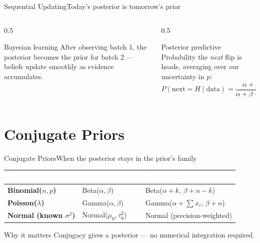 \documentclass[aspectratio=169,11pt]{beamer}
\begin{document}
\begin{frame}{Sequential Updating}{Today's posterior is tomorrow's prior}
  \begin{columns}[T]
    \begin{column}{0.5\textwidth}
      \begin{block}{Bayesian learning}
        \small After observing batch 1, the posterior becomes the prior
        for batch 2 — beliefs update smoothly as evidence accumulates.
      \end{block}
    \end{column}
    \begin{column}{0.5\textwidth}
      \begin{exampleblock}{Posterior predictive}
        \small Probability the \emph{next} flip is heads, averaging over
        our uncertainty in $p$:
        \[ P(\text{next}=H\mid\text{data}) = \frac{\alpha+k}{\alpha+\beta+n} \]
      \end{exampleblock}
    \end{column}
  \end{columns}
\end{frame}

\section{Conjugate Priors}

\begin{frame}{Conjugate Priors}{When the posterior stays in the prior's family}
  \small
  \renewcommand{\arraystretch}{1.35}
  \begin{center}
  \begin{tabularx}{\textwidth}{@{}>{\bfseries}l l >{\raggedright\arraybackslash}X@{}}
    \toprule
    \rowcolor{PrimaryDark}
    \textcolor{white}{Likelihood} & \textcolor{white}{Conjugate prior} & \textcolor{white}{Posterior} \\
    \midrule
    Binomial($n,p$) & Beta($\alpha,\beta$) & Beta($\alpha+k,\,\beta+n-k$) \\
    \rowcolor{PrimaryLight!25}
    Poisson($\lambda$) & Gamma($\alpha,\beta$) & Gamma($\alpha+\sum x_i,\,\beta+n$) \\
    Normal (known $\sigma^2$) & Normal($\mu_0,\tau_0^2$) & Normal (precision-weighted) \\
    \bottomrule
  \end{tabularx}
  \end{center}
  \begin{alertblock}{Why it matters}
    \small Conjugacy gives a  posterior — no numerical
    integration required.
  \end{alertblock}
\end{frame}
\end{document}
